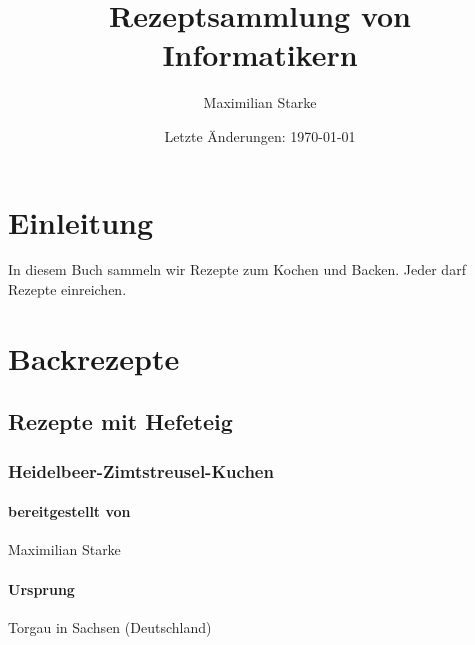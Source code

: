 \documentclass[a4paper]{book}
\title{Rezeptsammlung von Informatikern}
\date{Letzte Änderungen: \today}
\author{Maximilian Starke}
\begin{document}
\maketitle
\tableofcontents

\chapter*{Einleitung}

In diesem Buch sammeln wir Rezepte zum Kochen und Backen.
Jeder darf Rezepte einreichen. 

\chapter{Backrezepte}


\section{Rezepte mit Hefeteig}

\newpage
\subsection{Heidelbeer-Zimtstreusel-Kuchen}

\subsubsection{bereitgestellt von}
	Maximilian Starke
\subsubsection{Ursprung}
	Torgau in Sachsen (Deutschland)
\end{document}

